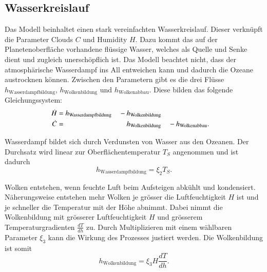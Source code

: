 \begin{refsection}
\subsection{Wasserkreislauf}
%
Das Modell beinhaltet einen stark vereinfachten Wasserkreislauf.
Dieser verknüpft die Parameter Clouds $C$ und Humidity $H$.
Dazu kommt das auf der Planetenoberfläche vorhandene flüssige Wasser, welches als Quelle und Senke dient und zugleich unerschöpflich ist. Das Modell beachtet nicht, dass der atmosphärische Wasserdampf ins All entweichen kann und dadurch die Ozeane austrocknen können. Zwischen den Parametern gibt es die drei Flüsse $h_{\text{Wasserdampfbildung}}$, $h_{\text{Wolkenbildung}}$ und $h_{\text{Wolkenabbau}}$. Diese bilden das folgende Gleichungssystem:
\begin{equation}
\begin{aligned}
\dot{H}
&=
h_{\text{Wasserdampfbildung}}&
	&-h_{\text{Wolkenbildung}}
		&                      \\
\dot{C}
&=&
	&\quad\hspace{0.27mm}h_{\text{Wolkenbildung}}&
		&-h_{\text{Wolkenabbau}}
\text{.}
\end{aligned}
\end{equation}

Wasserdampf bildet sich durch Verdunsten von Wasser aus den Ozeanen. Der Durchsatz wird linear zur Oberflächentemperatur $T_S$ angenommen und ist dadurch
\begin{equation}
h_{\text{Wasserdampfbildung}} = \xi_2 T_S \text{.}
\end{equation}


Wolken entstehen, wenn feuchte Luft beim Aufsteigen abkühlt und kondensiert. Näherungsweise entstehen mehr Wolken je grösser die Luftfeuchtigkeit $H$ ist und je schneller die Temperatur mit der Höhe abnimmt.
Dabei nimmt die Wolkenbildung mit grösserer Luftfeuchtigkeit $H$ und grösserem Temperaturgradienten $\frac{dT}{dh}$ zu. Durch Multiplizieren mit einem wählbaren Parameter $\xi_3$ kann die Wirkung des Prozesses justiert werden. Die Wolkenbildung ist somit
\begin{equation}
h_{\text{Wolkenbildung}} = \xi_3 H \frac{dT}{dh} \text{.}
\end{equation}


\end{refsection}
